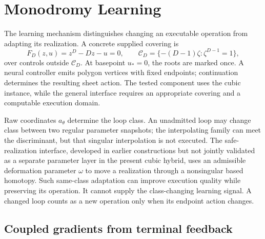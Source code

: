 \section{Monodromy Learning}
\label{sec:monodromy-learning-main}

The learning mechanism distinguishes changing an executable operation from
adapting its realization. A concrete supplied covering is
\begin{equation}
 F_D(z,u)=z^D-Dz-u=0,\qquad
 \mathcal C_D=\{-(D-1)\zeta:\zeta^{D-1}=1\},
 \label{eq:main-polynomial-cover}
\end{equation}
over controls outside $\mathcal C_D$. At basepoint $u_*=0$, the roots are
marked once. A neural controller emits polygon vertices with fixed endpoints;
continuation determines the resulting sheet action. The tested component uses
the cubic instance, while the general interface requires an appropriate
covering and a computable execution domain.

Raw coordinates $a_\theta$ determine the loop class. An unadmitted loop may
change class between two regular parameter snapshots; the interpolating family
can meet the discriminant, but that singular interpolation is not executed.
The safe-realization interface, developed in earlier constructions but not
jointly validated as a separate parameter layer in the present cubic hybrid,
uses an admissible deformation parameter $\omega$ to move a realization
through a nonsingular based homotopy. Such same-class adaptation can improve
execution quality while preserving its operation. It cannot supply the
class-changing learning signal. A changed loop counts as a new operation only
when its endpoint action changes.

\subsection{Coupled gradients from terminal feedback}

